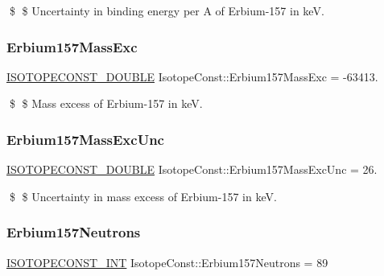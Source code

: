 \$ \$ Uncertainty in binding energy per A of Erbium-\/157 in keV. \mbox{\label{group___isotope_const-_erbium-_er157_ga2094b9088d3888a667b43842868e647b}} 
\subsubsection{\texorpdfstring{Erbium157\+Mass\+Exc}{Erbium157MassExc}}
{\footnotesize\ttfamily \mbox{\hyperlink{group___isotope_const-_macros_ga8f45a7272ce02c0b4c65c44636ed719a}{I\+S\+O\+T\+O\+P\+E\+C\+O\+N\+S\+T\+\_\+\+D\+O\+U\+B\+LE}} Isotope\+Const\+::\+Erbium157\+Mass\+Exc = -\/63413.}

\$ \$ Mass excess of Erbium-\/157 in keV. \mbox{\label{group___isotope_const-_erbium-_er157_gab2c4e3c2c10bbb32e97f5a4b13d63d2c}} 
\subsubsection{\texorpdfstring{Erbium157\+Mass\+Exc\+Unc}{Erbium157MassExcUnc}}
{\footnotesize\ttfamily \mbox{\hyperlink{group___isotope_const-_macros_ga8f45a7272ce02c0b4c65c44636ed719a}{I\+S\+O\+T\+O\+P\+E\+C\+O\+N\+S\+T\+\_\+\+D\+O\+U\+B\+LE}} Isotope\+Const\+::\+Erbium157\+Mass\+Exc\+Unc = 26.}

\$ \$ Uncertainty in mass excess of Erbium-\/157 in keV. \mbox{\label{group___isotope_const-_erbium-_er157_ga6b92821c93d24eae401ed84a144f1b7d}} 
\subsubsection{\texorpdfstring{Erbium157\+Neutrons}{Erbium157Neutrons}}
{\footnotesize\ttfamily \mbox{\hyperlink{group___isotope_const-_macros_ga5f18360b3e99483a35c32d789e62621c}{I\+S\+O\+T\+O\+P\+E\+C\+O\+N\+S\+T\+\_\+\+I\+NT}} Isotope\+Const\+::\+Erbium157\+Neutrons = 89}

